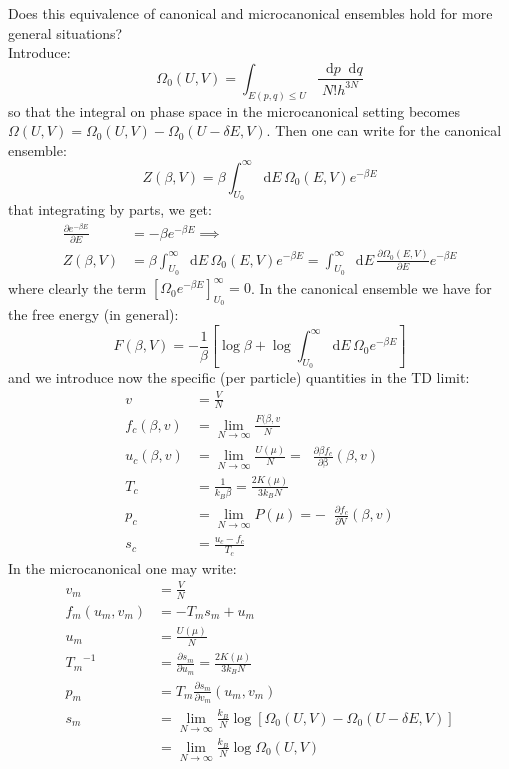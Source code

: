 \documentclass{article}
\newcommand*\diff{\mathop{}\!\mathrm{d}}
\newcommand*\derbeta[1]{\mathop{}\!\frac{\partial #1}{\partial \mathrm{\beta}} }
\newcommand*\derV[1]{\mathop{}\!\frac{\partial #1}{\partial \mathrm{V}} }
\begin{document}
Does this equivalence of canonical and microcanonical ensembles hold for more general situations?\\
Introduce:
$$ \Omega_0(U,V) = \int_{E(p,q)\leq U} \frac{\diff{p}\diff{q}}{N! h^{3N}}$$
so that the integral on phase space in the microcanonical setting becomes $\Omega(U,V) = \Omega_0 (U,V) -\Omega_0 (U-\delta E,V)$. Then one can write for the canonical ensemble:
$$Z(\beta,V) = \beta \int_{U_0}^\infty \diff{E} \, \Omega_0(E,V) e^{-\beta E} $$
that integrating by parts, we get:
\begin{equation*}
    \begin{aligned}
    \frac{\partial e^{-\beta E} }{\partial E} &= -\beta e^{-\beta E} \implies \\
    Z(\beta,V) &= \beta \int_{U_0}^\infty \diff{E} \, \Omega_0(E,V) e^{-\beta E} =  \int_{U_0}^\infty \diff{E} \, \frac{ \partial \Omega_0(E,V)}{\partial E} e^{-\beta E}  
    \end{aligned}
\end{equation*}
where clearly the term $[\Omega_0 e^{-\beta E}]_{U_0}^\infty = 0$. In the canonical ensemble we have for the free energy (in general):
$$F(\beta,V) =- \frac{1}{\beta} [\log \beta + \log \int_{U_0}^\infty \diff{E}\, \Omega_0 e^{-\beta E}] $$
and we introduce now the specific (per particle) quantities in the TD limit:
\begin{equation*}
    \begin{aligned}
    v &= \frac{V}{N}\\
    f_c (\beta, v ) &= \lim_{N\xrightarrow{} \infty} \frac{F(\beta, v}{N}\\
    u_c(\beta,v) &= \lim_{N\xrightarrow{} \infty} \frac{U(\mu)}{N} = \derbeta{\beta f_c} (\beta,v)\\
    T_c &= \frac{1}{k_B \beta} = \frac{2 K(\mu)}{3 k_B N}\\
    p_c &= \lim_{N\xrightarrow{} \infty} P(\mu) =- \derV{f_c} (\beta,v)\\
    s_c &= \frac{u_c-f_c}{T_c} 
    \end{aligned}
\end{equation*}
In the microcanonical one may write:
\begin{equation}
\begin{aligned}
    v_m &= \frac{V}{N} \\
    f_m(u_m,v_m) &= -T_m s_m +u_m\\
    u_m &= \frac{U(\mu)}{N}\\
    {T_m}^{-1} &= \frac{\partial s_m}{\partial u_m} = \frac{2 K(\mu)}{3 k_B N}\\
    p_m &= T_m \frac{\partial s_m}{\partial v_m} (u_m,v_m)\\
    s_m &= \lim_{N\xrightarrow{} \infty} \frac{k_B}{N} \log [ \Omega_0 (U,V) -\Omega_0 (U-\delta E,V)] \\
    &= \lim_{N\xrightarrow{} \infty} \frac{k_B}{N} \log \Omega_0 (U,V)
\end{aligned}    
\end{equation}
\end{document}
